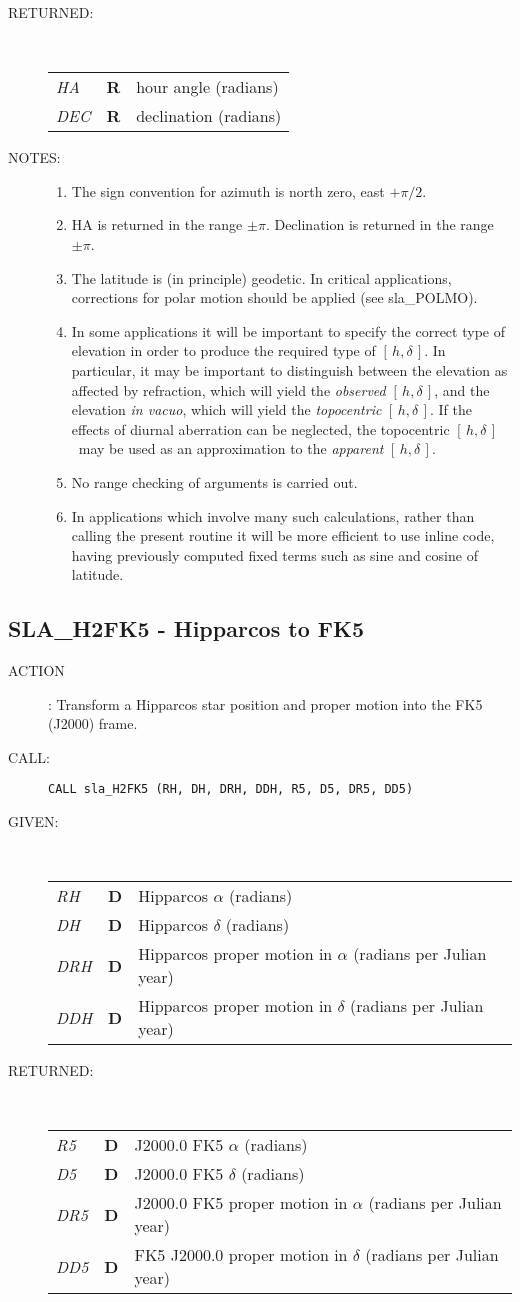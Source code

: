 \documentclass[11pt,twoside]{article}
\newcommand{\xlabel}[1]{}
\newcommand{\hadec}     {$[\,h,\delta\,]$}
\newcommand{\routine}[3]
{\hbadness=10000
  \vbox
  {
    \rule{\textwidth}{0.3mm}\\
    {\Large {\bf #1} \hfill #2 \hfill {\bf #1}}\\
    \setlength{\oldspacing}{\topsep}
    \setlength{\topsep}{0.3ex}
    \begin{description}
      #3
    \end{description}
    \setlength{\topsep}{\oldspacing}
  }
}
\renewcommand{\routine}[3]
   {
      \subsection{#1\xlabel{#1} - #2\label{#1}}
       \begin{description}
         #3
       \end{description}
   }
\newcommand{\action}[1]
{\item[ACTION]: #1}
\newcommand{\action}[1]
   {\item[ACTION:] #1}
\newcommand{\call}[1]
{\item[CALL]: \hspace{0.4em}{\tt #1}}
\newlength{\oldspacing}
\renewcommand{\call}[1]
   {
    \item[CALL:] {\tt #1}
   }
\newcommand{\args}[2]
{
  \goodbreak
  \setlength{\oldspacing}{\topsep}
  \setlength{\topsep}{0.3ex}
  \begin{description}
  \item[#1]:\\[1.5ex]
    \begin{tabular}{p{7em}p{6em}p{22em}}
      #2
    \end{tabular}
  \end{description}
  \setlength{\topsep}{\oldspacing}
}
\renewcommand{\args}[2]
   {
     \begin{description}
        \item[#1:]\\
        \begin{tabular}{p{7em}p{6em}l}
           #2
        \end{tabular}
     \end{description}
   }
\newcommand{\spec}[3]
{
  {\em {#1}} & {\bf \mbox{#2}} & {#3}
}
\newcommand{\notes}[1]
{
  \goodbreak
  \setlength{\oldspacing}{\topsep}
  \setlength{\topsep}{0.3ex}
  \begin{description}
    \item[NOTES]:
        #1
  \end{description}
  \setlength{\topsep}{\oldspacing}
}
\renewcommand{\notes}[1]
   {
      \begin{description}
         \item[NOTES:]
            #1
      \end{description}
   }
\begin{document}
\args{RETURNED}
{
 \spec{HA}{R}{hour angle (radians)} \\
 \spec{DEC}{R}{declination (radians)}
}
\notes
{
 \begin{enumerate}
  \item The sign convention for azimuth is north zero, east $+\pi/2$.
  \item HA is returned in the range $\pm\pi$.  Declination is returned
        in the range $\pm\pi$.
  \item The latitude is (in principle) geodetic.  In critical
        applications, corrections for polar motion should be applied
        (see sla\_POLMO).
  \item In some applications it will be important to specify the
        correct type of elevation in order to produce the required
        type of \hadec.  In particular, it may be important to
        distinguish between the elevation as affected by refraction,
        which will yield the {\it observed} \hadec, and the elevation
        {\it in vacuo}, which will yield the {\it topocentric}
        \hadec.  If the
        effects of diurnal aberration can be neglected, the
        topocentric \hadec\ may be used as an approximation to the
        {\it apparent} \hadec.
  \item No range checking of arguments is carried out.
  \item In applications which involve many such calculations, rather
        than calling the present routine it will be more efficient to
        use inline code, having previously computed fixed terms such
        as sine and cosine of latitude.
 \end{enumerate}
}
\routine{SLA\_H2FK5}{Hipparcos to FK5}
{
 \action{Transform a Hipparcos star position and proper motion
         into the FK5 (J2000) frame.}
 \call{CALL sla\_H2FK5 (RH, DH, DRH, DDH, R5, D5, DR5, DD5)}
}
\args{GIVEN}
{
 \spec{RH}{D}{Hipparcos $\alpha$ (radians)} \\
 \spec{DH}{D}{Hipparcos $\delta$ (radians)} \\
 \spec{DRH}{D}{Hipparcos proper motion in $\alpha$
                              (radians per Julian year)} \\
 \spec{DDH}{D}{Hipparcos proper motion in $\delta$
                              (radians per Julian year)}
}
\args{RETURNED}
{
 \spec{R5}{D}{J2000.0 FK5 $\alpha$ (radians)} \\
 \spec{D5}{D}{J2000.0 FK5 $\delta$ (radians)} \\
 \spec{DR5}{D}{J2000.0 FK5 proper motion in $\alpha$
                              (radians per Julian year)} \\
 \spec{DD5}{D}{FK5 J2000.0 proper motion in $\delta$
                              (radians per Julian year)}
}
\end{document}
